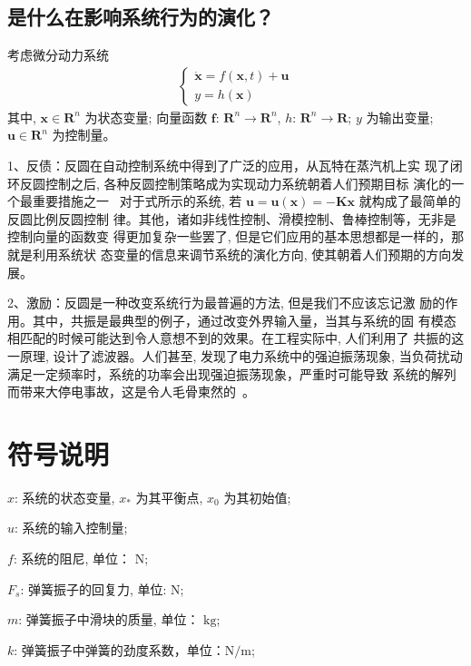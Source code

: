 \documentclass[withoutpreface,bwprint]{cumcmthesis} %
\begin{document}
\subsection{是什么在影响系统行为的演化？}
\label{sec2-2}

考虑微分动力系统
\begin{align}
\label{eq1}
\begin{cases}
\dot{\bm x}=f({\bm x}, t)+{\bm u} \\
y=h({\bm x})
\end{cases}
\end{align}
其中, $ \boldsymbol{x} \in \boldsymbol{R}^{n} $ 为状态变量; 向量函数 $ \boldsymbol{f}$: $\boldsymbol{R}^{n} \rightarrow \boldsymbol{R}^{n}$, $h$: $\boldsymbol{R}^{n} \rightarrow \boldsymbol{R} $; $y$  为输出变量;
 $\boldsymbol{u} \in \boldsymbol{R}^{n}$  为控制量。

 1、反债：反圆在自动控制系统中得到了广泛的应用，从瓦特在蒸汽机上实 现了闭环反圆控制之后, 各种反圆控制策略成为实现动力系统朝着人们预期目标 演化的一个最重要措施之一~
 对于式所示的系统, 若 $ \boldsymbol{u}=\boldsymbol{u}(\boldsymbol{x})=-\boldsymbol{K} \boldsymbol{x} $ 就构成了最简单的反圆比例反圆控制
 律。其他，诸如非线性控制、滑模控制、鲁棒控制等，无非是控制向量的函数变 得更加复杂一些罢了, 但是它们应用的基本思想都是一样的，那就是利用系统状 态变量的信息来调节系统的演化方向, 使其朝着人们预期的方向发展。

 2、激励：反圆是一种改变系统行为最普遍的方法, 但是我们不应该忘记激 励的作用。其中，共振是最典型的例子，通过改变外界输入量，当其与系统的固 有模态相匹配的时候可能达到令人意想不到的效果。在工程实际中, 人们利用了 共振的这一原理, 设计了滤波器。人们甚至, 发现了电力系统中的强迫振荡现象, 当负荷扰动满足一定频率时，系统的功率会出现强迫振荡现象，严重时可能导致 系统的解列而带来大停电事故，这是令人毛骨柬然的~。

\section{符号说明}
\label{sec3}

$x$:  系统的状态变量, $ x_{*}$  为其平衡点,  $x_{0} $ 为其初始值;

$u$:  系统的输入控制量;

$f$:  系统的阻尼, 单位： $ \mathrm{N} $;

$F_{s}$:  弹簧振子的回复力, 单位: $ \mathrm{N} $;

$m$:  弹簧振子中滑块的质量, 单位： $ \mathrm{kg} $;

$k$:  弹簧振子中弹簧的劲度系数，单位：$  \mathrm{N} / \mathrm{m} $;
\end{document}
